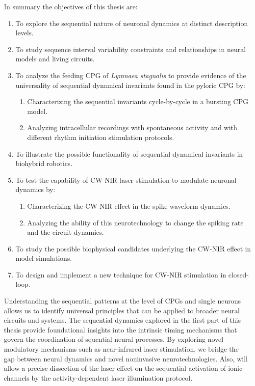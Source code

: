 In summary the objectives of this thesis are:
\begin{enumerate}
    \item To explore the sequential nature of neuronal dynamics at distinct description levels. 
    \item To study sequence interval variability constraints and relationships in neural models and living circuits.
    \item To analyze the feeding CPG of \textit{Lymnaea stagnalis} to provide evidence of the universality of sequential dynamical invariants found in the pyloric CPG by:
    \begin{enumerate}
        \item Characterizing the sequential invariants cycle-by-cycle in a bursting CPG model. 
        \item Analyzing intracellular recordings with spontaneous activity and with different rhythm initiation stimulation protocols. 
    \end{enumerate}
    \item To illustrate the possible functionality of sequential dynamical invariants in biohybrid robotics. 
    \item To test the capability of CW-NIR laser stimulation to modulate neuronal dynamics by: 
    \begin{enumerate}
        \item Characterizing the CW-NIR effect in the spike waveform dynamics. 
        \item Analyzing  the ability of this neurotechnology to change the spiking rate and the circuit dynamics. 
    \end{enumerate}
    \item To study the possible biophysical candidates underlying the CW-NIR effect in model simulations. 
    \item To design and implement a new technique for CW-NIR stimulation in closed-loop. 
\end{enumerate}

Understanding the sequential patterns at the level of CPGs and single neurons allows us to identify universal principles that can be applied to broader neural circuits and systems. The sequential dynamics explored in the first part of this thesis provide foundational insights into the intrinsic timing mechanisms that govern the coordination of squential neural processes. By exploring novel modulatory  mechanisms such as near-infrared laser stimulation, we bridge the gap between neural dynamics and novel noninvasive neurotechnologies. Also, will allow a precise dissection of the laser effect on the sequential activation of  ionic-channels by the activity-dependent laser illumination protocol. 
